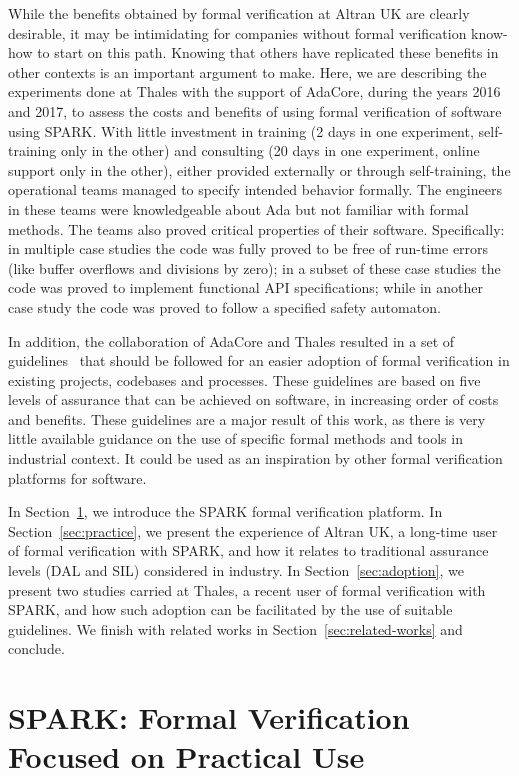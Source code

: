 \documentclass{eceasst}
\begin{document}
While the benefits obtained by formal verification at Altran UK are clearly
desirable, it may be intimidating for companies without formal verification
know-how to start on this path. Knowing that others have replicated these
benefits in other contexts is an important argument to make.  Here, we are
describing the experiments done at Thales with the support of AdaCore,
during the years 2016 and 2017, to
assess the costs and benefits of using formal verification of software using
SPARK. With little investment in training (2 days in one experiment, self-training
only in the other) and consulting (20 days in one experiment, online support only
in the other), either provided
externally or through self-training, the operational teams managed to specify
intended behavior formally. The engineers in these teams were knowledgeable
about Ada but not familiar with formal methods.
The teams also proved critical
properties of their software. Specifically: in multiple case studies the code was
fully proved to be free of run-time errors (like buffer overflows and divisions
by zero); in a subset of these case studies the code was proved to implement
functional API specifications; while in another case study the code was proved to
follow a specified safety automaton.

In addition, the collaboration of AdaCore and Thales resulted in a set of
guidelines~\cite{AdaCoreThalesSPARK} that should be followed for an easier
adoption of formal verification in existing projects, codebases and
processes. These guidelines are based on five levels of assurance that can be
achieved on software, in increasing order of costs and benefits. These
guidelines are a major result of this work, as there is very little available
guidance on the use of specific formal methods and tools in industrial
context. It could be used as an inspiration by other formal verification
platforms for software.

In Section~\ref{sec:SPARK}, we introduce the SPARK formal verification
platform. In Section~\ref{sec:practice}, we present the experience of Altran
UK, a long-time user of formal verification with SPARK, and how it relates to
traditional assurance levels (DAL and SIL) considered in industry. In
Section~\ref{sec:adoption}, we present two studies carried at Thales, a recent
user of formal verification with SPARK, and how such adoption can be
facilitated by the use of suitable guidelines. We finish with related works in
Section~\ref{sec:related-works} and conclude.

\section{SPARK: Formal Verification Focused on Practical Use}
\label{sec:SPARK}
\end{document}
